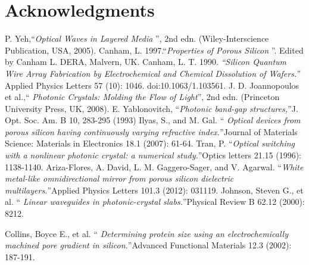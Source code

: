 \documentclass{article}
\begin{document}
\section{Acknowledgments}
\label{sec:acknowledgments}
%

\begin{thebibliography}{X}
 P. Yeh,\textquotedblleft \emph{Optical Waves in Layered
    Media} \textquotedblright, 2nd edn. (Wiley-Interscience
  Publication,
  USA, 2005).
Canham, L. 1997.\textquotedblleft \emph{Properties of
    Porous Silicon} \textquotedblright. Edited by Canham L. DERA,
  Malvern, UK.
Canham, L. T. 1990. \emph{\textquotedblleft Silicon
    Quantum Wire Array Fabrication by Electrochemical and Chemical
    Dissolution of Wafers.\textquotedblright} Applied Physics
  Letters 57 (10): 1046. doi:10.1063/1.103561.
 J. D. Joannopoulos et al.,\textquotedblleft
  \emph{Photonic Crystals: Molding the Flow of
    Light}\textquotedblright, 2nd edn.
  (Princeton University Press, UK, 2008).
 E. Yablonovitch, \textquotedblleft \emph{Photonic
    band-gap structures,}\textquotedblright J. Opt. Soc. Am. B 10,
  283-295 (1993)
 Ilyas, S., and M. Gal.  \textquotedblleft \emph{
    Optical devices from porous silicon having continuously varying
    refractive index.}\textquotedblright Journal of Materials
  Science: Materials in Electronics 18.1 (2007): 61-64.
 Tran, P. \textquotedblleft \emph{Optical switching with
    a nonlinear photonic crystal: a numerical
    study.}\textquotedblright Optics letters 21.15 (1996):
  1138-1140.
 Ariza-Flores, A. David, L. M. Gaggero-Sager, and
  V. Agarwal. \textquotedblleft \emph{White metal-like
    omnidirectional mirror from porous silicon dielectric
    multilayers.}\textquotedblright Applied Physics Letters 101.3
  (2012): 031119.
 Johnson, Steven G., et al.  \textquotedblleft
  \emph{Linear waveguides in photonic-crystal
    slabs.}\textquotedblright Physical Review B 62.12 (2000): 8212.

Collins, Boyce E., et al. \textquotedblleft \emph{
    Determining protein size using an electrochemically machined
    pore gradient in silicon.}\textquotedblright Advanced Functional
  Materials 12.3 (2002): 187-191.


\end{thebibliography}
\end{document}
